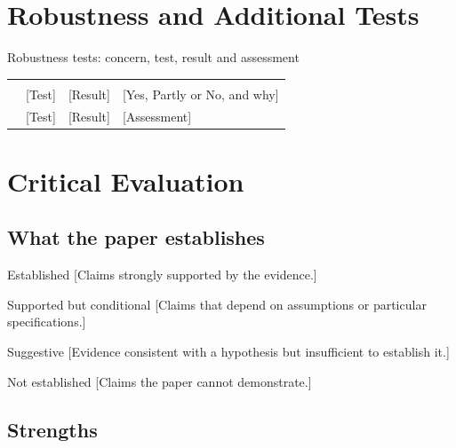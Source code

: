\documentclass{lrreview}
\begin{document}
\section{Robustness and Additional Tests}

\begin{lrtable}{Robustness tests: concern, test, result and assessment}\label{tab:rob}
\lrsans\fontsize{8.4}{10.5}\selectfont
\begin{xltabular}{\linewidth}{@{}L L L L@{}}
\lrtoprule
{} &  &  & \\
\lrheadrule
\endhead
\lrbottomrule
\endfoot
\relax [Concern] & [Test] & [Result] & [Yes, Partly or No, and why]\\
\lrrowrule
\relax [Concern] & [Test] & [Result] & [Assessment]\\
\end{xltabular}
\end{lrtable}

\section{Critical Evaluation}

\subsection{What the paper establishes}
\begin{lrfinding}{Established}
[Claims strongly supported by the evidence.]
\end{lrfinding}
\begin{lrfinding}{Supported but conditional}
[Claims that depend on assumptions or particular specifications.]
\end{lrfinding}
\begin{lrfinding}{Suggestive}
[Evidence consistent with a hypothesis but insufficient to establish it.]
\end{lrfinding}
\begin{lrfinding}{Not established}
[Claims the paper cannot demonstrate.]
\end{lrfinding}

\subsection{Strengths}
\end{document}
